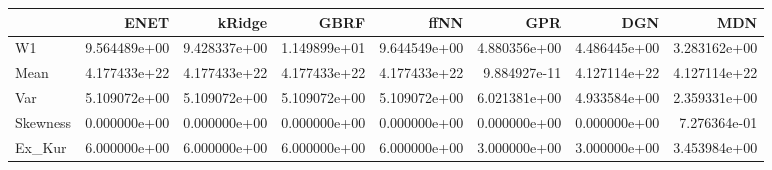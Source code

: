 \begin{tabular}{lrrrrrrr}
\toprule
{} &          ENET &        kRidge &          GBRF &          ffNN &           GPR &           DGN &           MDN \\
\midrule
W1       &  9.564489e+00 &  9.428337e+00 &  1.149899e+01 &  9.644549e+00 &  4.880356e+00 &  4.486445e+00 &  3.283162e+00 \\
Mean     &  4.177433e+22 &  4.177433e+22 &  4.177433e+22 &  4.177433e+22 &  9.884927e-11 &  4.127114e+22 &  4.127114e+22 \\
Var      &  5.109072e+00 &  5.109072e+00 &  5.109072e+00 &  5.109072e+00 &  6.021381e+00 &  4.933584e+00 &  2.359331e+00 \\
Skewness &  0.000000e+00 &  0.000000e+00 &  0.000000e+00 &  0.000000e+00 &  0.000000e+00 &  0.000000e+00 &  7.276364e-01 \\
Ex\_Kur   &  6.000000e+00 &  6.000000e+00 &  6.000000e+00 &  6.000000e+00 &  3.000000e+00 &  3.000000e+00 &  3.453984e+00 \\
\bottomrule
\end{tabular}
